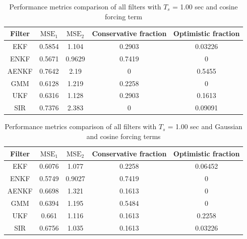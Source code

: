 \documentclass[]{article}
\begin{document}
\begin{table}[h!]
\centering
\begin{tabular}{|c|c|c|c|c|}
\hline
Filter & $\mathrm{MSE}_1$ & $\mathrm{MSE}_2$ & Conservative fraction & Optimistic fraction \\
\hline
EKF &   0.5854 &    1.104 &   0.2903 &  0.03226 \\
\hline
ENKF &   0.5671 &   0.9629 &   0.7419 &        0 \\
\hline
AENKF &   0.7642 &     2.19 &        0 &   0.5455 \\
\hline
GMM &   0.6128 &    1.219 &   0.2258 &        0 \\
\hline
UKF &   0.6316 &    1.128 &   0.2903 &   0.1613 \\
\hline
SIR &   0.7376 &    2.383 &        0 &  0.09091 \\
\hline
\end{tabular}
\caption{Performance metrics comparison of all filters with $T_s$ = 1.00 sec and cosine forcing term}
\label{table:compare_case_2_sample_2}
\end{table}


\begin{table}[h!]
\centering
\begin{tabular}{|c|c|c|c|c|}
\hline
Filter & $\mathrm{MSE}_1$ & $\mathrm{MSE}_2$ & Conservative fraction & Optimistic fraction \\
\hline
EKF &   0.6076 &    1.077 &   0.2258 &  0.06452 \\
\hline
ENKF &   0.5749 &   0.9027 &   0.7419 &        0 \\
\hline
AENKF &   0.6698 &    1.321 &   0.1613 &        0 \\
\hline
GMM &   0.6394 &    1.195 &   0.5484 &        0 \\
\hline
UKF &    0.661 &    1.116 &   0.1613 &   0.2258 \\
\hline
SIR &   0.6756 &    1.035 &   0.1613 &  0.03226 \\
\hline
\end{tabular}
\caption{Performance metrics comparison of all filters with $T_s$ = 1.00 sec and Gaussian and cosine forcing terms}
\label{table:compare_case_3_sample_2}
\end{table}



\end{document}
